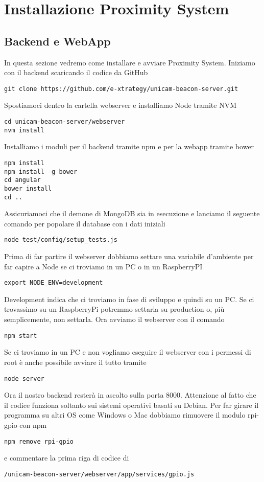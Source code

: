 \chapter{Installazione Proximity System}
\section{Backend e WebApp}
In questa sezione vedremo come installare e avviare Proximity System.
Iniziamo con il backend scaricando il codice da GitHub
\begin{lstlisting}[style=JavaScriptCode]
git clone https://github.com/e-xtrategy/unicam-beacon-server.git
\end{lstlisting}
Spostiamoci dentro la cartella webserver e installiamo Node tramite NVM
\begin{lstlisting}[style=JavaScriptCode]
cd unicam-beacon-server/webserver
nvm install
\end{lstlisting}
Installiamo i moduli per il backend tramite npm e per la webapp tramite bower
\begin{lstlisting}[style=JavaScriptCode]
npm install
npm install -g bower
cd angular
bower install
cd ..
\end{lstlisting}
Assicuriamoci che il demone di MongoDB sia in esecuzione e lanciamo il seguente comando per popolare il database con i dati iniziali
\begin{lstlisting}[style=JavaScriptCode]
node test/config/setup_tests.js
\end{lstlisting}
Prima di far partire il webserver dobbiamo settare una variabile d'ambiente per far capire a Node se ci troviamo in un PC o in un RaspberryPI
\begin{lstlisting}[style=JavaScriptCode]
export NODE_ENV=development
\end{lstlisting}
Development indica che ci troviamo in fase di sviluppo e quindi su un PC.
Se ci trovassimo su un RaspberryPi potremmo settarla su production o, più semplicemente, non settarla.
Ora avviamo il webserver con il comando
\begin{lstlisting}[style=JavaScriptCode]
npm start
\end{lstlisting}
Se ci troviamo in un PC e non vogliamo eseguire il webserver con i permessi di root è anche possibile avviare il tutto tramite
\begin{lstlisting}[style=JavaScriptCode]
node server
\end{lstlisting}
Ora il nostro backend resterà in ascolto sulla porta 8000.
Attenzione al fatto che il codice funziona soltanto sui sistemi operativi basati su Debian.
Per far girare il programma su altri OS come Windows o Mac dobbiamo rimuovere il modulo rpi-gpio con npm 
\begin{lstlisting}[style=JavaScriptCode]
npm remove rpi-gpio
\end{lstlisting}
e commentare la prima riga di codice di
\begin{lstlisting}[style=JavaScriptCode]
/unicam-beacon-server/webserver/app/services/gpio.js
\end{lstlisting}
